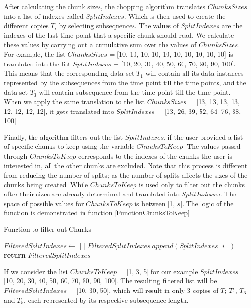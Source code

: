 After calculating the chunk sizes, the chopping algorithm translates $ChunksSizes$ into a list of indexes called $SplitIndexes$.
Which is then used to create the different copies $T_{i}$ by selecting subsequences.
The values of $SplitIndexes$ are the indexes of the last time point that a specific chunk should read.
We calculate these values by carrying out a cumulative sum over the values of $ChunksSizes$.
For example, the list $ChunksSizes$ = [10, 10, 10, 10, 10, 10, 10, 10, 10, 10] is translated into the list $SplitIndexes$ = [10, 20, 30, 40, 50, 60, 70, 80, 90, 100].
This means that the corresponding data set $T_{1}$ will contain all its data instances represented by the subsequences from the  time point till the  time points,
and the data set $T_{3}$ will contain subsequence from the  time point till the  time point.
When we apply the same translation to the list $ChunksSizes$ = [13, 13, 13, 13, 12, 12, 12, 12], it gets translated into $SplitIndexes$ = [13, 26, 39, 52, 64, 76, 88, 100].

Finally, the algorithm filters out the list $SplitIndexes$, if the user provided a list of specific chunks to keep using the variable $ChunksToKeep$.
The values passed through $ChunksToKeep$ corresponds to the indexes of the chunks the user is interested in, all the other chunks are excluded.
Note that this process is different from reducing the number of splits; as the number of splits affects the sizes of the chunks being created.
While $ChunksToKeep$ is used only to filter out the chunks after their sizes are already determined and translated into $SplitIndexes$.
The space of possible values for $ChunksToKeep$ is between [1, $s$]. The logic of the function is demonstrated in function \ref{FunctionChunksToKeep}

\begin{algorithm}
    \caption{Function to filter out Chunks}\label{FunctionChunksToKeep}
    \begin{algorithmic}[1]
      \State $FilteredSplitIndexes \gets$ [ ]
                \State $FilteredSplitIndexes.append(SplitIndexes[i])$
        \EndFor
        \State \textbf{return} $FilteredSplitIndexes$
      \EndFunction
    \end{algorithmic}
\end{algorithm}

If we consider the list $ChunksToKeep$ = [1, 3, 5] for our example $SplitIndexes$ = [10, 20, 30, 40, 50, 60, 70, 80, 90, 100].
The resulting filtered list will be $FilteredSplitIndexes$ = [10, 30, 50], which will result in only 3 copies of $T$; $T_{1}$, $T_{3}$ and $T_{5}$,
each represented by its respective subsequence length.

